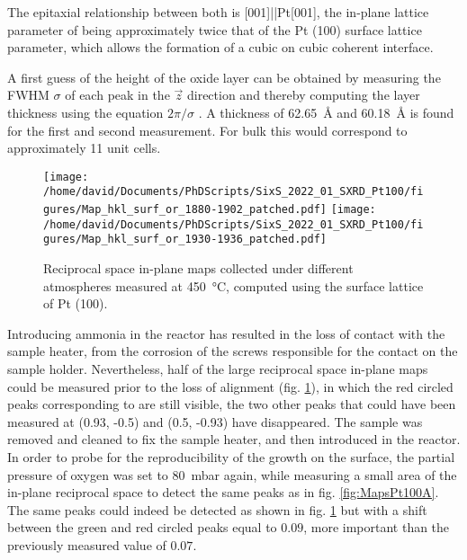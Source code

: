 The epitaxial relationship between both is [001]||Pt[001], the in-plane lattice parameter of  being approximately twice that of the Pt (100) surface lattice parameter, which allows the formation of a cubic on cubic coherent interface.

A first guess of the height of the oxide layer can be obtained by measuring the FWHM $\sigma$ of each peak in the $\vec{z}$ direction and thereby computing the layer thickness using the equation $2\pi/\sigma$ \parencite{Warren1990}.
A thickness of \qty{62.65}{\angstrom} and \qty{60.18}{\angstrom} is found for the first and second measurement.
For bulk  this would correspond to approximately 11 unit cells.

\begin{figure}[!htb]
    \centering
    \texttt{[image: /home/david/Documents/PhDScripts/SixS\_2022\_01\_SXRD\_Pt100/figures/Map\_hkl\_surf\_or\_1880-1902\_patched.pdf]}
    \texttt{[image: /home/david/Documents/PhDScripts/SixS\_2022\_01\_SXRD\_Pt100/figures/Map\_hkl\_surf\_or\_1930-1936\_patched.pdf]}
    \caption{
        Reciprocal space in-plane maps collected under different atmospheres measured at \qty{450}{\degreeCelsius}, computed using the surface lattice of Pt (100).
    }
    \label{fig:MapsPt100B}
\end{figure}

Introducing ammonia in the reactor has resulted in the loss of contact with the sample heater, from the corrosion of the screws responsible for the contact on the sample holder.
Nevertheless, half of the large reciprocal space in-plane maps could be measured prior to the loss of alignment (fig. \ref{fig:MapsPt100B}), in which the red circled peaks corresponding to  are still visible, the two other peaks that could have been measured at (0.93, -0.5) and (0.5, -0.93) have disappeared.
The sample was removed and cleaned to fix the sample heater, and then introduced in the reactor.
In order to probe for the reproducibility of the  growth on the surface, the partial pressure of oxygen was set to \qty{80}{\milli\bar} again, while measuring a small area of the in-plane reciprocal space to detect the same peaks as in fig. \ref{fig:MapsPt100A}.
The same peaks could indeed be detected as shown in fig. \ref{fig:MapsPt100B} but with a shift between the green and red circled peaks equal to $0.09$, more important than the previously measured value of $0.07$.

